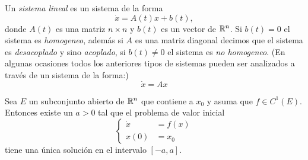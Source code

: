     Un \textit{sistema lineal} es un sistema de la forma
    \begin{equation}
    	\dot{x} = A(t)x + b(t),
    	\label{eq: sistemaLineal}
    \end{equation}
    donde $A(t)$ es una matriz $n \times n$ y $b(t)$ es un vector de ${\mathbb{R}}^{n}$. Si $b(t) = 0$ el sistema es \textit{homogeneo}, además si $A$ es una matriz diagonal decimos que el sistema es \textit{desacoplado} y sino \textit{acoplado}, si $b(t) \neq 0$ el sistema es \textit{no homogeneo}. (En algunas ocasiones todos los anteriores tipos de sistemas pueden ser analizados a través de un sistema de la forma:)
    \begin{equation}
    	\dot{x} = Ax
    \end{equation}
    
    Sea $E$ un subconjunto abierto de ${\mathbb{R}}^{n}$ que contiene a $x_{0}$ y asuma que $f \in C^{1}(E)$. Entonces existe un $a>0$ tal que el problema de valor inicial 
    \begin{equation}
    	\left\{
    	\begin{aligned}
    		\dot{x} &= f(x) \\
    		x(0) &= x_{0}
    	\end{aligned}
    	\right.
    	\label{eq: pvi}
    \end{equation}
    tiene una única solución en el intervalo $[-a,a]$.
    
